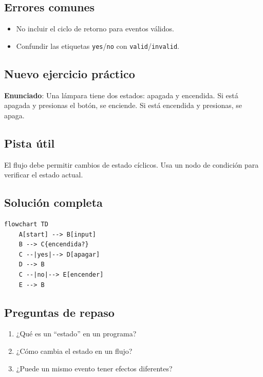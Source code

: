 \documentclass[12pt]{article}
\begin{document}
\subsection{Errores comunes}

\begin{itemize}
    \item No incluir el ciclo de retorno para eventos válidos.
    \item Confundir las etiquetas \texttt{yes}/\texttt{no} con \texttt{valid}/\texttt{invalid}.
\end{itemize}

\subsection{Nuevo ejercicio práctico}

\textbf{Enunciado}: Una lámpara tiene dos estados: apagada y encendida. Si está apagada y presionas el botón, se enciende. Si está encendida y presionas, se apaga.

\subsection{Pista útil}

El flujo debe permitir cambios de estado cíclicos. Usa un nodo de condición para verificar el estado actual.

\subsection{Solución completa}

\begin{lstlisting}[style=mermaidstyle]
flowchart TD
    A[start] --> B[input]
    B --> C{encendida?}
    C --|yes|--> D[apagar]
    D --> B
    C --|no|--> E[encender]
    E --> B
\end{lstlisting}

\subsection{Preguntas de repaso}

\begin{enumerate}
    \item ¿Qué es un ``estado'' en un programa?
    \item ¿Cómo cambia el estado en un flujo?
    \item ¿Puede un mismo evento tener efectos diferentes?
\end{enumerate}
\end{document}
